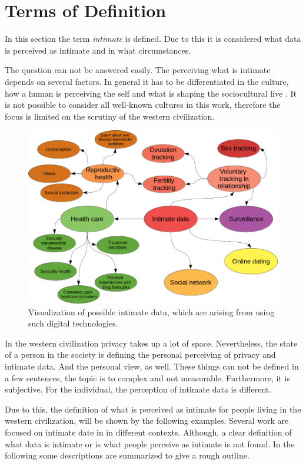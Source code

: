 \section{Terms of Definition}
\label{sec:terms_of_definition}
In this section the term \textit{intimate} is defined. Due to this it is considered what data is perceived as intimate and in what circumstances.

The question can not be answered easily. The perceiving what is intimate depends on several factors.
In general it has to be differentiated in the culture, how a human is perceiving the self and what is shaping the sociocultural live \cite{carrithers1985category}. It is not possible to consider all well-known cultures in this work, therefore the focus is limited on the scrutiny of the western civilization. 
\begin{figure}[htb]
	\centering
	\includegraphics[width=\linewidth]{img/cluster.png}
	\caption{Visualization of possible intimate data, which are arising from using such digital technologies.}
	\label{fig:cluster}
\end{figure}
In the western civilization privacy takes up a lot of space. Nevertheless, the state of a person in the society is defining the personal perceiving of privacy and intimate data. And the personal view, as well.
These things can not be defined in a few sentences, the topic is to complex and not measurable. Furthermore, it is subjective. For the individual, the perception of intimate data is different.

Due to this, the definition of what is perceived as intimate for people living in the western civilization, will be shown by the following examples. Several work are focused on intimate date in in different contexts. Although, a clear definition of what data is intimate or is what people perceive as intimate is not found.
In the following some descriptions are summarized to give a rough outline.

